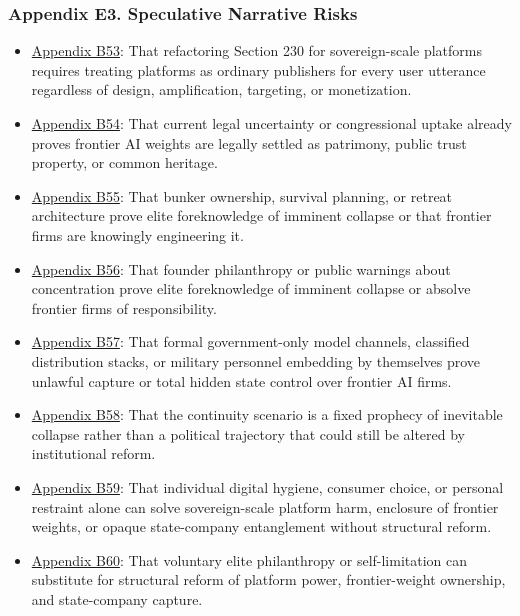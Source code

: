\documentclass[
  american,
  11pt,
  letterpaper,
]{article}
\providecommand{\tightlist}{%
  \setlength{\itemsep}{0pt}\setlength{\parskip}{0pt}}
\begin{document}
\subsubsection{Appendix E3. Speculative Narrative
Risks}\label{ch-10-appendix-e3-speculative-narrative-risks}

\begin{itemize}
\tightlist
\item
  \hyperref[ch-10-appendix-b53-refactoring-section-230-for-sovereign-scale-platforms-requires-treating-platforms]{Appendix
  B53}: That refactoring Section 230 for sovereign-scale platforms
  requires treating platforms as ordinary publishers for every user
  utterance regardless of design, amplification, targeting, or
  monetization.
\item
  \hyperref[ch-10-appendix-b54-current-legal-uncertainty-or-congressional-uptake-already-proves-frontier-ai-weig]{Appendix
  B54}: That current legal uncertainty or congressional uptake already
  proves frontier AI weights are legally settled as patrimony, public
  trust property, or common heritage.
\item
  \hyperref[ch-10-appendix-b55-bunker-ownership-survival-planning-or-retreat-architecture-prove-elite-foreknow]{Appendix
  B55}: That bunker ownership, survival planning, or retreat
  architecture prove elite foreknowledge of imminent collapse or that
  frontier firms are knowingly engineering it.
\item
  \hyperref[ch-10-appendix-b56-founder-philanthropy-or-public-warnings-about-concentration-prove-elite-foreknowl]{Appendix
  B56}: That founder philanthropy or public warnings about concentration
  prove elite foreknowledge of imminent collapse or absolve frontier
  firms of responsibility.
\item
  \hyperref[ch-10-appendix-b57-formal-government-only-model-channels-classified-distribution-stacks-or-militar]{Appendix
  B57}: That formal government-only model channels, classified
  distribution stacks, or military personnel embedding by themselves
  prove unlawful capture or total hidden state control over frontier AI
  firms.
\item
  \hyperref[ch-10-appendix-b58-the-continuity-scenario-is-a-fixed-prophecy-of-inevitable-collapse-rather-than-a]{Appendix
  B58}: That the continuity scenario is a fixed prophecy of inevitable
  collapse rather than a political trajectory that could still be
  altered by institutional reform.
\item
  \hyperref[ch-10-appendix-b59-individual-digital-hygiene-consumer-choice-or-personal-restraint-alone-can-solv]{Appendix
  B59}: That individual digital hygiene, consumer choice, or personal
  restraint alone can solve sovereign-scale platform harm, enclosure of
  frontier weights, or opaque state-company entanglement without
  structural reform.
\item
  \hyperref[ch-10-appendix-b60-voluntary-elite-philanthropy-or-self-limitation-can-substitute-for-structural-ref]{Appendix
  B60}: That voluntary elite philanthropy or self-limitation can
  substitute for structural reform of platform power, frontier-weight
  ownership, and state-company capture.
\end{itemize}
\end{document}
